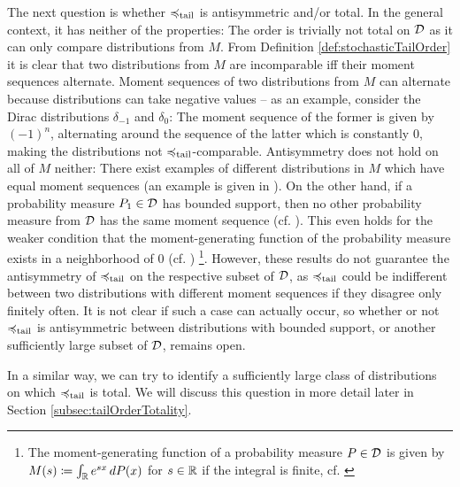 \documentclass[a4paper,DIV=11]{scrreprt}
\newcommand{\M}{M}
\theoremstyle{definition}
\begin{document}
    The next question is whether $\preccurlyeq_{\text{tail}}$ is antisymmetric and/or total.
    In the general context, it has neither of the properties: The order is trivially not total on $\mathcal{D}$ as it can only compare distributions from $M$.
    From Definition \ref{def:stochasticTailOrder} it is clear that two distributions from $M$ are incomparable iff their moment sequences alternate. Moment sequences of two distributions from $M$ can alternate because distributions can take negative values -- as an example, consider the Dirac distributions $\delta_{-1}$ and $\delta_{0}$: The moment sequence of the former is given by $(-1)^n$, alternating around the sequence of the latter which is constantly $0$, making the distributions not $\preccurlyeq_{\text{tail}}$-comparable.
    Antisymmetry does not hold on all of $M$ neither: There exist examples of different distributions in $\M$ which have equal moment sequences (an example is given in \cite[Example 3.15]{bib:romanoCounterexamplesInProbability}).
    On the other hand, if a probability measure $P_1 \in \mathcal{D}$ has bounded support, then no other probability measure from $\mathcal{D}$ has the same moment sequence (cf. \cite[Corollary 4.2]{bib:schmuedgenTheMomentProblem}).
    This even holds for the weaker condition that the moment-generating function of the probability measure exists in a neighborhood of 0 (cf. \cites[Lemma 2.3]{bib:rassGameRiskManagI}[p.414]{bib:billingsleyProbabilityAndMeasure})
     \footnote{The moment-generating function of a probability measure $P \in \mathcal{D}$ is given by $M(s) \coloneqq \int_{\mathbb{R}} e^{sx} \, dP(x)$ for $s \in \mathbb{R}$ if the integral is finite, cf. \cite[(21.21)]{bib:billingsleyProbabilityAndMeasure}}.
    However, these results do not guarantee the antisymmetry of $\preccurlyeq_{\text{tail}}$ on the respective subset of $\mathcal{D}$, as $\preccurlyeq_{\text{tail}}$ could be indifferent between two distributions with different moment sequences if they disagree only finitely often. It is not clear if such a case can actually occur, so whether or not $\preccurlyeq_{\text{tail}}$ is antisymmetric between distributions with bounded support, or another sufficiently large subset of $\mathcal{D}$, remains open.
    
    In a similar way, we can try to identify a sufficiently large class of distributions on which $\preccurlyeq_{\text{tail}}$ is total. We will discuss this question in more detail later in Section \ref{subsec:tailOrderTotality}.
    
\end{document}
